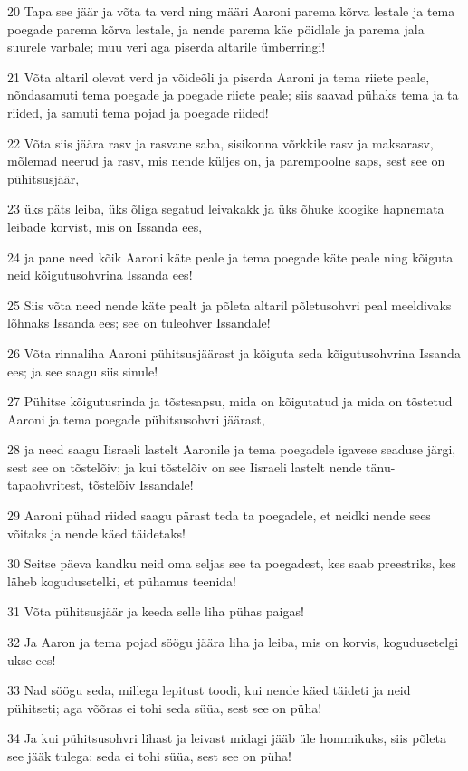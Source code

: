 \par 20 Tapa see jäär ja võta ta verd ning määri Aaroni parema kõrva lestale ja tema poegade parema kõrva lestale, ja nende parema käe pöidlale ja parema jala suurele varbale; muu veri aga piserda altarile ümberringi!
\par 21 Võta altaril olevat verd ja võideõli ja piserda Aaroni ja tema riiete peale, nõndasamuti tema poegade ja poegade riiete peale; siis saavad pühaks tema ja ta riided, ja samuti tema pojad ja poegade riided!
\par 22 Võta siis jäära rasv ja rasvane saba, sisikonna võrkkile rasv ja maksarasv, mõlemad neerud ja rasv, mis nende küljes on, ja parempoolne saps, sest see on pühitsusjäär,
\par 23 üks päts leiba, üks õliga segatud leivakakk ja üks õhuke koogike hapnemata leibade korvist, mis on Issanda ees,
\par 24 ja pane need kõik Aaroni käte peale ja tema poegade käte peale ning kõiguta neid kõigutusohvrina Issanda ees!
\par 25 Siis võta need nende käte pealt ja põleta altaril põletusohvri peal meeldivaks lõhnaks Issanda ees; see on tuleohver Issandale!
\par 26 Võta rinnaliha Aaroni pühitsusjäärast ja kõiguta seda kõigutusohvrina Issanda ees; ja see saagu siis sinule!
\par 27 Pühitse kõigutusrinda ja tõstesapsu, mida on kõigutatud ja mida on tõstetud Aaroni ja tema poegade pühitsusohvri jäärast,
\par 28 ja need saagu Iisraeli lastelt Aaronile ja tema poegadele igavese seaduse järgi, sest see on tõstelõiv; ja kui tõstelõiv on see Iisraeli lastelt nende tänu-tapaohvritest, tõstelõiv Issandale!
\par 29 Aaroni pühad riided saagu pärast teda ta poegadele, et neidki nende sees võitaks ja nende käed täidetaks!
\par 30 Seitse päeva kandku neid oma seljas see ta poegadest, kes saab preestriks, kes läheb kogudusetelki, et pühamus teenida!
\par 31 Võta pühitsusjäär ja keeda selle liha pühas paigas!
\par 32 Ja Aaron ja tema pojad söögu jäära liha ja leiba, mis on korvis, kogudusetelgi ukse ees!
\par 33 Nad söögu seda, millega lepitust toodi, kui nende käed täideti ja neid pühitseti; aga võõras ei tohi seda süüa, sest see on püha!
\par 34 Ja kui pühitsusohvri lihast ja leivast midagi jääb üle hommikuks, siis põleta see jääk tulega: seda ei tohi süüa, sest see on püha!
